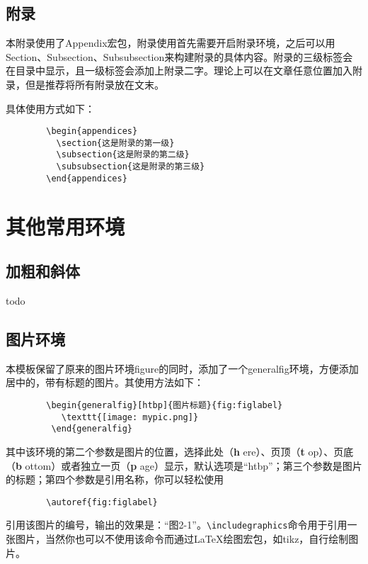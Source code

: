 \documentclass[UTF8,sub3section]{ctexart}
\begin{document}
	\subsection{附录}
	本附录使用了Appendix宏包，附录使用首先需要开启附录环境，之后可以用Section、Subsection、Subsubsection来构建附录的具体内容。附录的三级标签会在目录中显示，且一级标签会添加上附录二字。理论上可以在文章任意位置加入附录，但是推荐将所有附录放在文末。
	
	具体使用方式如下：
	\begin{verbatim}
		\begin{appendices}
		  \section{这是附录的第一级}
		  \subsection{这是附录的第二级}
		  \subsubsection{这是附录的第三级}
		\end{appendices}
	\end{verbatim}
	
	\section{其他常用环境}
	\subsection{加粗和斜体}
	todo
	
	\subsection{图片环境}
	本模板保留了原来的图片环境figure的同时，添加了一个generalfig环境，方便添加居中的，带有标题的图片。其使用方法如下：
	\begin{verbatim}
		\begin{generalfig}[htbp]{图片标题}{fig:figlabel}
		   \texttt{[image: mypic.png]}
		 \end{generalfig}
	\end{verbatim}
	其中该环境的第二个参数是图片的位置，选择此处（{\bfseries h} ere）、页顶（{\bfseries t} op）、页底（{\bfseries b} ottom）或者独立一页（{\bfseries p} age）显示\textsuperscript{\cite[\S 5.3]{9787121202087}}，默认选项是“htbp”；第三个参数是图片的标题；第四个参数是引用名称，你可以轻松使用
	\begin{verbatim}
		\autoref{fig:figlabel}
	\end{verbatim}
	引用该图片的编号，输出的效果是：“图2-1”。\verb|\includegraphics|命令用于引用一张图片，当然你也可以不使用该命令而通过\LaTeX 绘图宏包，如tikz，自行绘制图片。
	
\end{document}
